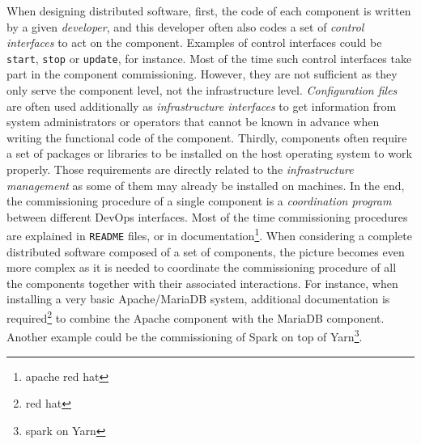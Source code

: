 When designing distributed software, first, the code of each component
is written by a given \emph{developer}, and this developer often also
codes a set of \emph{control interfaces} to act on the
component. Examples of control interfaces could be \texttt{start},
\texttt{stop} or \texttt{update}, for instance. Most of the time such
control interfaces take part in the component commissioning. However,
they are not sufficient as they only serve the component level, not
the infrastructure level. \emph{Configuration files} are often
used additionally as \emph{infrastructure interfaces} to get
information from system administrators or operators that cannot be
known in advance when writing the functional code of the
component. Thirdly, components often require a set of packages or
libraries to be installed on the host operating system to work
properly. Those requirements are directly related to the
\emph{infrastructure management} as some of them may already be
installed on machines.
In the end, the commissioning procedure of a single component is a
\emph{coordination program} between different DevOps interfaces. Most
of the time commissioning procedures are explained in \texttt{README}
files, or in documentation\footnote{apache red hat}.
%
%
When considering a complete distributed software composed of a set of
components, the picture becomes even more complex as it is needed to
coordinate the commissioning procedure of all the components together
with their associated interactions. For instance, when installing a
very basic Apache/MariaDB system, additional documentation is
required\footnote{red hat} to combine the Apache component with the
MariaDB component. Another example could be the commissioning of Spark
on top of Yarn\footnote{spark on Yarn}.


